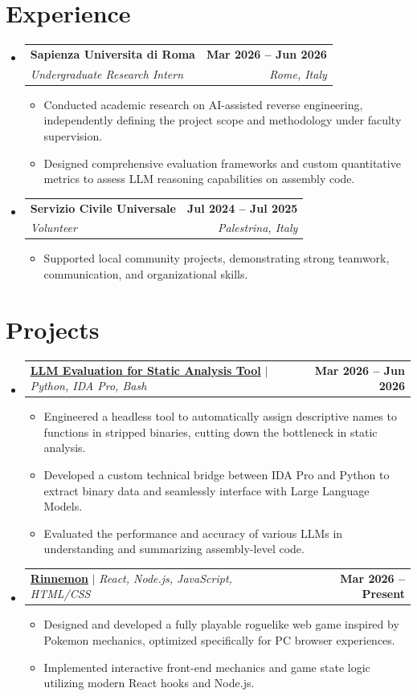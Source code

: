 \documentclass[letterpaper,11pt]{article}
\makeatletter
\newcommand{\resumeItem}[1]{
  \item\small{
    {#1 \vspace{-2pt}}
  }
}
\newcommand{\resumeSubheading}[4]{
  \vspace{-2pt}\item
    \begin{tabular*}{1.0\textwidth}[t]{l@{\extracolsep{\fill}}r}
      \textbf{#1} & \textbf{\small #2} \\
      \textit{\small#3} & \textit{\small #4} \\
    \end{tabular*}\vspace{-7pt}
}
\newcommand{\resumeProjectHeading}[2]{
    \item
    \begin{tabular*}{1.001\textwidth}{l@{\extracolsep{\fill}}r}
      \small#1 & \textbf{\small #2}\\
    \end{tabular*}\vspace{-7pt}
}
\newcommand{\resumeSubHeadingListStart}{\begin{itemize}[leftmargin=0.0in, label={}]}
\newcommand{\resumeSubHeadingListEnd}{\end{itemize}}
\newcommand{\resumeItemListStart}{\begin{itemize}}
\newcommand{\resumeItemListEnd}{\end{itemize}\vspace{-5pt}}
\makeatother
\begin{document}
\section{Experience}
  \resumeSubHeadingListStart

    \resumeSubheading
      {Sapienza Universita di Roma}{Mar 2026 -- Jun 2026}
      {Undergraduate Research Intern}{Rome, Italy}
      \resumeItemListStart
        \resumeItem{Conducted academic research on AI-assisted reverse engineering, independently defining the project scope and methodology under faculty supervision.}
        \resumeItem{Designed comprehensive evaluation frameworks and custom quantitative metrics to assess LLM reasoning capabilities on assembly code.}
      \resumeItemListEnd

    \resumeSubheading
      {Servizio Civile Universale}{Jul 2024 -- Jul 2025}
      {Volunteer}{Palestrina, Italy}
      \resumeItemListStart
        \resumeItem{Supported local community projects, demonstrating strong teamwork, communication, and organizational skills.}
      \resumeItemListEnd
    
  \resumeSubHeadingListEnd
\vspace{-16pt}

\section{Projects}
    \vspace{-5pt}
    \resumeSubHeadingListStart
      \resumeProjectHeading
          {\textbf{\href{https://github.com/lucaccc1/valutazione-llm-per-analisi-statica-binari}{LLM Evaluation for Static Analysis Tool}} $|$ \emph{Python, IDA Pro, Bash}}{Mar 2026 -- Jun 2026}
          \resumeItemListStart
            \resumeItem{Engineered a headless tool to automatically assign descriptive names to functions in stripped binaries, cutting down the bottleneck in static analysis.}
            \resumeItem{Developed a custom technical bridge between IDA Pro and Python to extract binary data and seamlessly interface with Large Language Models.}
            \resumeItem{Evaluated the performance and accuracy of various LLMs in understanding and summarizing assembly-level code.}
          \resumeItemListEnd
          \vspace{-13pt}
      \resumeProjectHeading
          {\textbf{\href{https://github.com/lucaccc1/rinnemon}{Rinnemon}} $|$ \emph{React, Node.js, JavaScript, HTML/CSS}}{Mar 2026 -- Present}
          \resumeItemListStart
            \resumeItem{Designed and developed a fully playable roguelike web game inspired by Pokemon mechanics, optimized specifically for PC browser experiences.}
            \resumeItem{Implemented interactive front-end mechanics and game state logic utilizing modern React hooks and Node.js.}
          \resumeItemListEnd 
    \resumeSubHeadingListEnd
\vspace{-15pt}
\end{document}
